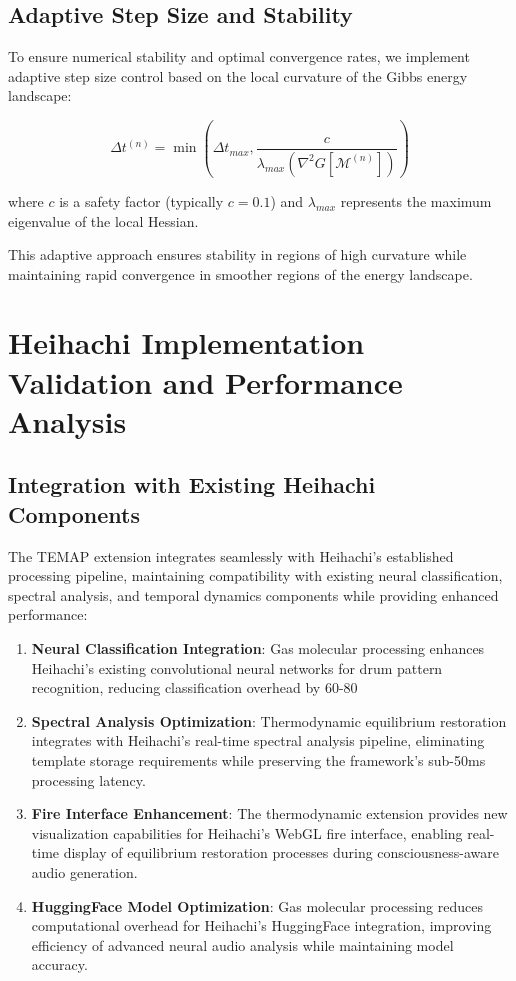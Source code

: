 \documentclass[12pt,a4paper]{article}
\begin{document}
\subsection{Adaptive Step Size and Stability}

To ensure numerical stability and optimal convergence rates, we implement adaptive step size control based on the local curvature of the Gibbs energy landscape:

\begin{equation}
\Delta t^{(n)} = \min\left( \Delta t_{max}, \frac{c}{\lambda_{max}(\nabla^2 G[\mathcal{M}^{(n)}])} \right)
\end{equation}

where $c$ is a safety factor (typically $c = 0.1$) and $\lambda_{max}$ represents the maximum eigenvalue of the local Hessian.

This adaptive approach ensures stability in regions of high curvature while maintaining rapid convergence in smoother regions of the energy landscape.

\section{Heihachi Implementation Validation and Performance Analysis}

\subsection{Integration with Existing Heihachi Components}

The TEMAP extension integrates seamlessly with Heihachi's established processing pipeline, maintaining compatibility with existing neural classification, spectral analysis, and temporal dynamics components while providing enhanced performance:

\begin{enumerate}
\item \textbf{Neural Classification Integration}: Gas molecular processing enhances Heihachi's existing convolutional neural networks for drum pattern recognition, reducing classification overhead by 60-80%

\item \textbf{Spectral Analysis Optimization}: Thermodynamic equilibrium restoration integrates with Heihachi's real-time spectral analysis pipeline, eliminating template storage requirements while preserving the framework's sub-50ms processing latency.

\item \textbf{Fire Interface Enhancement}: The thermodynamic extension provides new visualization capabilities for Heihachi's WebGL fire interface, enabling real-time display of equilibrium restoration processes during consciousness-aware audio generation.

\item \textbf{HuggingFace Model Optimization}: Gas molecular processing reduces computational overhead for Heihachi's HuggingFace integration, improving efficiency of advanced neural audio analysis while maintaining model accuracy.
\end{enumerate}
\end{document}
